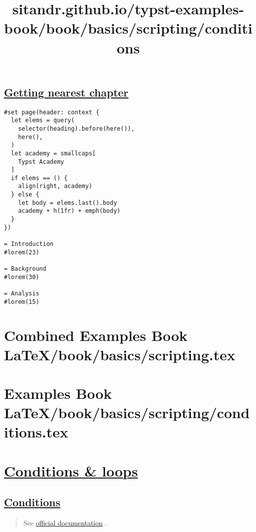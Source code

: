 \pandocbounded{}

\subsection{\texorpdfstring{\hyperref[getting-nearest-chapter]{Getting
nearest
chapter}}{Getting nearest chapter}}\label{getting-nearest-chapter}

\begin{verbatim}
#set page(header: context {
  let elems = query(
    selector(heading).before(here()),
    here(),
  )
  let academy = smallcaps[
    Typst Academy
  ]
  if elems == () {
    align(right, academy)
  } else {
    let body = elems.last().body
    academy + h(1fr) + emph(body)
  }
})

= Introduction
#lorem(23)

= Background
#lorem(30)

= Analysis
#lorem(15)
\end{verbatim}

\pandocbounded{}




\section{Combined Examples Book LaTeX/book/basics/scripting.tex}
\section{Examples Book LaTeX/book/basics/scripting/conditions.tex}
\title{sitandr.github.io/typst-examples-book/book/basics/scripting/conditions}

\section{\texorpdfstring{\hyperref[conditions--loops]{Conditions \&
loops}}{Conditions \& loops}}\label{conditions--loops}

\subsection{\texorpdfstring{\hyperref[conditions]{Conditions}}{Conditions}}\label{conditions}

\begin{quote}
See
\href{https://typst.app/docs/reference/scripting/\#conditionals}{official
documentation} .
\end{quote}

